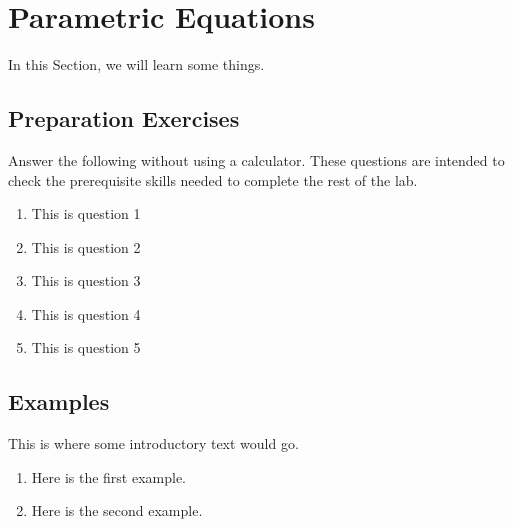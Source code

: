 
\section{Parametric Equations} \label{section-parametric-equations}
In this Section, we will learn some things.
\subsection*{Preparation Exercises} \label{preparation-exercises-section-parametric-equations}



\begin{myPrep}
Answer the following without using a calculator. These questions are intended to check the prerequisite skills needed to complete the rest of the lab.
	\begin{enumerate}
		\item This is question 1
		\vfill
		\item This is question 2
		\vfill
		\item This is question 3
		\vfill
		\item This is question 4
		\vfill
		\item This is question 5
		\vfill
	\end{enumerate}
\end{myPrep}
\vfill


\newpage

\subsection*{Examples} \label{examples-section-parametric-equations}

This is where some introductory text would go.

\begin{myExample}
\begin{enumerate}

\item Here is the first example.
\vfill

\item Here is the second example.
\vfill

\end{enumerate}
\end{myExample}


